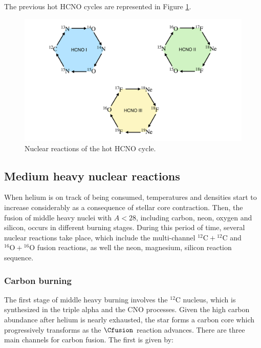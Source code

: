 \documentclass[openany]{book}
\begin{document}
The previous hot HCNO cycles are represented in Figure \ref{fig:nuclerReactionppHCNO}.

\begin{figure}[H]
	\centering 
	\includegraphics[scale=0.25]{Graphs/HCNOchart.pdf}
	\caption[Nuclear reactions of the HCNO cycles]{Nuclear reactions of the hot HCNO cycle.}
	\label{fig:nuclerReactionppHCNO}
\end{figure}

\subsection{Medium heavy nuclear reactions} \label{sub:mediumHeavyReactions}

When helium is on track of being consumed, temperatures and densities start to increase considerably as a consequence of stellar core contraction. Then, the fusion of middle heavy nuclei with $A < 28$, including carbon, neon, oxygen and silicon, occurs in different burning stages. During this period of time,  several nuclear reactions take place, which include the multi-channel $\mathrm{{}^{12}C + {}^{12}C}$ and $\mathrm{{}^{16}O + {}^{16}O}$ fusion reactions, as well the neon, magnesium, silicon reaction sequence. \\

\subsubsection{Carbon burning}\label{ssub:reactions_carbonBurning}

The first stage of middle heavy burning involves the $\mathrm{{}^{12}C}$ nucleus, which is synthesized in the triple alpha and the CNO processes. Given the high carbon abundance after helium is nearly exhausted, the star forms a carbon core which progressively transforms as the $\Cfusion$ reaction advances. There are three main channels for carbon fusion. The first is given by: 
\end{document}
